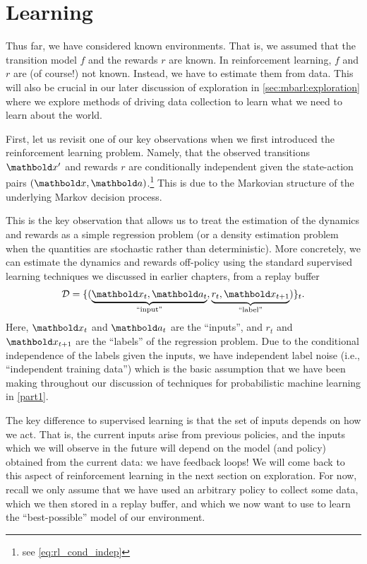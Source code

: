 \section{Learning}

Thus far, we have considered known environments.
That is, we assumed that the transition model $f$ and the rewards $r$ are known.
In reinforcement learning, $f$ and $r$ are (of course!) not known.
Instead, we have to estimate them from data.
This will also be crucial in our later discussion of exploration in \cref{sec:mbarl:exploration} where we explore methods of driving data collection to learn what we need to learn about the world.

First, let us revisit one of our key observations when we first introduced the reinforcement learning problem.
Namely, that the observed transitions $\vxp$ and rewards $r$ are conditionally independent given the state-action pairs $(\vx, \va)$.\footnote{see \cref{eq:rl_cond_indep}}
This is due to the Markovian structure of the underlying Markov decision process.

This is the key observation that allows us to treat the estimation of the dynamics and rewards as a simple regression problem (or a density estimation problem when the quantities are stochastic rather than deterministic).
More concretely, we can estimate the dynamics and rewards off-policy using the standard supervised learning techniques we discussed in earlier chapters, from a replay buffer \begin{align}
  \spD = \{(\underbrace{\vx_t, \va_t}_\text{``input''}, \underbrace{r_t, \vx_{t+1}}_\text{``label''})\}_t.
\end{align}
Here, $\vx_t$ and $\va_t$ are the ``inputs'', and $r_t$ and $\vx_{t+1}$ are the ``labels'' of the regression problem.
Due to the conditional independence of the labels given the inputs, we have independent label noise (i.e., ``independent training data'') which is the basic assumption that we have been making throughout our discussion of techniques for probabilistic machine learning in \cref{part1}.

The key difference to supervised learning is that the set of inputs depends on how we act.
That is, the current inputs arise from previous policies, and the inputs which we will observe in the future will depend on the model (and policy) obtained from the current data: we have feedback loops!
We will come back to this aspect of reinforcement learning in the next section on exploration.
For now, recall we only assume that we have used an arbitrary policy to collect some data, which we then stored in a replay buffer, and which we now want to use to learn the ``best-possible'' model of our environment.

